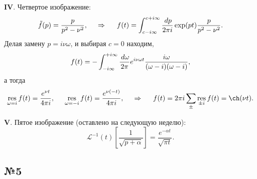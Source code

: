 \textbf{IV}. Четвертое изображение:
\begin{equation*}
    \tilde{f}(p) = \frac{p}{p^2 - \nu^2},
    \hspace{0.5cm} \Rightarrow \hspace{0.5cm}
    f(t) = \int_{c-i \infty}^{c+i \infty} \frac{\, d p}{2 \pi i} \exp(pt) \frac{p}{p^2 - \nu^2}.
\end{equation*}
Делая замену $p = i \nu \omega$, и выбирая $c=0$ находим,
\begin{equation*}
    f(t) = -\int_{-i \infty}^{+i \infty} \frac{\, d \omega}{2\pi} e^{i \nu \omega t} \frac{ i\omega}{( \omega - i)( \omega - i)},
\end{equation*}
а тогда
\begin{equation*}
    \res_{\omega = i} f(t) = \frac{e^{\nu  t}}{4 \pi i},
    \hspace{5 mm} 
    \res_{\omega = -i} f(t)= \frac{e^{\nu  (-t)}}{4 \pi i},
    \hspace{0.5cm} \Rightarrow \hspace{0.5cm}
    f(t) = 2 \pi i \sum_\pm \res_{\pm i} f(t) = \ch(\nu t).
\end{equation*}



\textbf{V}. Пятое изображение (оставлено на следующую неделю):
\begin{equation*}
     \mathcal L^{-1}(t) \left[
        \frac{1}{\sqrt{p + \alpha}}
    \right] = \frac{e^{- \alpha t}}{\sqrt{\pi t}}.
\end{equation*}




\subsection*{№5}


